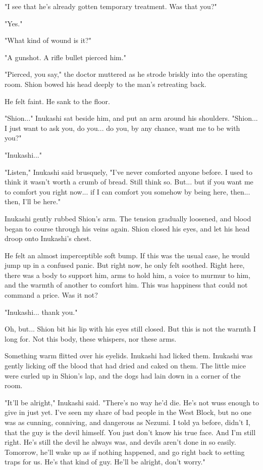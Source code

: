 "I see that he's already gotten temporary treatment. Was that you?"

"Yes."

"What kind of wound is it?"

"A gunshot. A rifle bullet pierced him."

"Pierced, you say," the doctor muttered as he strode briskly into the
operating room. Shion bowed his head deeply to the man's retreating
back.

He felt faint. He sank to the floor.

"Shion..." Inukashi sat beside him, and put an arm around his shoulders.
"Shion... I just want to ask you, do you... do you, by any chance, want
me to be with you?"

"Inukashi..."

"Listen," Inukashi said brusquely, "I've never comforted anyone before.
I used to think it wasn't worth a crumb of bread. Still think so. But...
but if you want me to comfort you right now... if I can comfort you
somehow by being here, then... then, I'll be here."

Inukashi gently rubbed Shion's arm. The tension gradually loosened, and
blood began to course through his veins again. Shion closed his eyes,
and let his head droop onto Inukashi's chest.

He felt an almost imperceptible soft bump. If this was the usual case,
he would jump up in a confused panic. But right now, he only felt
soothed. Right here, there was a body to support him, arms to hold him,
a voice to murmur to him, and the warmth of another to comfort him. This
was happiness that could not command a price. Was it not?

"Inukashi... thank you."

Oh, but... Shion bit his lip with his eyes still closed. But this is not
the warmth I long for. Not this body, these whispers, nor these arms.

Something warm flitted over his eyelids. Inukashi had licked them.
Inukashi was gently licking off the blood that had dried and caked on
them. The little mice were curled up in Shion's lap, and the dogs had
lain down in a corner of the room.

"It'll be alright," Inukashi said. "There's no way he'd die. He's not
wuss enough to give in just yet. I've seen my share of bad people in the
West Block, but no one was as cunning, conniving, and dangerous as
Nezumi. I told ya before, didn't I, that the guy is the devil himself.
You just don't know his true face. And I'm still right. He's still the
devil he always was, and devils aren't done in so easily. Tomorrow,
he'll wake up as if nothing happened, and go right back to setting traps
for us. He's that kind of guy. He'll be alright, don't worry."

